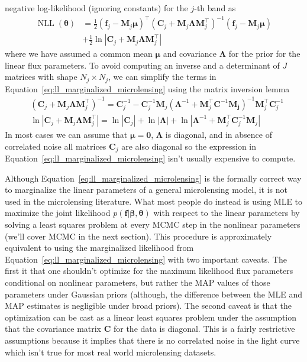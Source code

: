 \documentclass[12pt,dvipsnames]{report}
\renewcommand{\vec}[1]{\boldsymbol{\mathbf{#1}}}
\begin{document}
negative log-likelihood (ignoring constants) for the $j$-th band as
\begin{align}
    \operatorname{NLL}(\vec{\theta}) & =\frac{1}{2}\left( \vec{f}_j-\vec{M}_j\vec{\mu}\right)^\intercal\left(\vec{C}_j + \vec{M}_j\vec{\Lambda}\vec{M}_j^\intercal\right)^{-1}
    \left( \vec{f}_j-\vec{M}_j\vec{\mu}\right)                                                                                                                                 \\
                                     & + \frac{1}{2}\ln\left| \vec{C}_j + \vec{M}_j\vec{\Lambda}\vec{M}_j^\intercal\right|
    \label{eq:ll_marginalized_microlensing}
\end{align}
where we have assumed a common mean $\vec{\mu}$ and covariance $\vec{\Lambda}$ for the
prior for the linear flux parameters.
To avoid computing an inverse and a determinant of $J$ matrices with shape $N_j\times N_j$,
we can simplify the terms in Equation~\ref{eq:ll_marginalized_microlensing} using the
matrix inversion lemma \citep[see for example Appendix A3 in][]{rasmussen2006}
\begin{align}
     & \left(\mathbf{C}_j+\vec{M}_j \boldsymbol{\Lambda} \vec{M}_j^{\intercal}\right)^{-1}=\mathbf{C}_j^{-1}-\mathbf{C}_j^{-1} \vec{M}_j\left(\boldsymbol{\Lambda}^{-1}+\vec{M}_j^{\intercal} \mathbf{C}^{-1} \vec{M_j}\right)^{-1} \vec{M}_j^{\intercal} \mathbf{C}_j^{-1} \\
     & \ln\left|\mathbf{C}_j+\vec{M}_j \vec{\Lambda} \vec{M}_j^{\intercal}\right|=\ln|\mathbf{C}_j| +\ln|\vec{\Lambda}| + \ln\left|\boldsymbol{\Lambda}^{-1}+\vec{M}_j^{\intercal} \mathbf{C}_j^{-1} \vec{M}_j\right|
\end{align}
In most cases we can assume that $\vec{\mu}=\vec{0}$, $\vec{\Lambda}$ is diagonal, and
in absence of correlated noise all matrices $\vec{C}_j$ are also diagonal so the expression
in Equation~\ref{eq:ll_marginalized_microlensing} isn't usually expensive to compute.

Although Equation~\ref{eq:ll_marginalized_microlensing} is the formally correct
way to marginalize the linear parameters of a general microlensing model, it is
not used in the microlensing literature. What most people do instead is using
MLE to maximize the joint likelihood $p(\vec{f}\lvert\vec\beta,\vec{\theta})$
with respect to the linear parameters by solving a least squares problem at
every MCMC step in the nonlinear parameters (we'll cover MCMC in the next
section). This procedure is approximately equivalent to using the marginalized
likelihood from Equation~\ref{eq:ll_marginalized_microlensing} with two
important caveats. The first it that one shouldn't optimize for the maximum
likelihood flux parameters conditional on nonlinear parameters, but rather the
MAP values of those parameters under Gaussian priors (although, the difference
between the MLE and MAP estimates is negligible under broad priors). The second
caveat is that the optimization can be cast as a linear least squares problem
under the assumption that the covariance matrix $\vec{C}$ for the data is
diagonal. This is a fairly restrictive assumptions because it implies that
there is no correlated noise in the light curve which isn't true for most real
world microlensing datasets.
\end{document}
